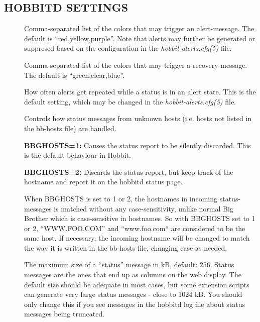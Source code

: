 \subsection{HOBBITD SETTINGS}


\begin{description}

\item[] Comma-separated list of the colors that may
  trigger an alert-message. The default is ``red,yellow,purple''. Note
  that alerts may further be generated or suppresed based on the
  configuration in the \emph{hobbit-alerts.cfg(5)} file. 

 

\item[] Comma-separated list of the colors that may
  trigger a recovery-message. The default is ``green,clear,blue''. 


 

\item[] How often alerts get repeated while a
  status is in an alert state. This is the default setting, which may
  be changed in the \emph{hobbit-alerts.cfg(5)} file. 


 

\item[] Controls how status messages from unknown
  hosts (i.e. hosts not listed in the bb-hosts file) are handled. 


 \textbf{BBGHOSTS=1:} Causes the status report to be silently
 discarded. This is the default behaviour in Hobbit. 



 \textbf{BBGHOSTS=2:}
 Discards the status report, but keep track of the hostname and report
 it on the hobbitd status page. 



  When BBGHOSTS is set to 1 or 2, the hostnames in incoming
  status-messages is matched without any case-sensitivity, unlike
  normal Big Brother which is case-sensitive in hostnames. So with
  BBGHOSTS set to 1 or 2, ``WWW.FOO.COM'' and ``www.foo.com`` are
  considered to be the same host. If necessary, the incoming hostname
  will be changed to match the way it is written in the bb-hosts file,
  changing case as needed. 



 

\item[] The maximum size of a ``status'' message
  in kB, default: 256. Status messages are the ones that end up as
  columns on the web display. The default size should be adequate in
  most cases, but some extension scripts can generate very large
  status messages - close to 1024 kB. You should only change this if
  you see messages in the hobbitd log file about status messages being
  truncated. 



\end{description}
